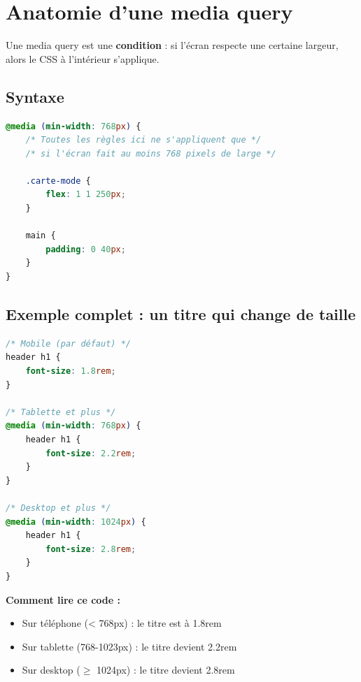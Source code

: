 \documentclass[11pt,a4paper]{article}
\begin{document}
\newpage

\section{Anatomie d'une media query}

Une media query est une \textbf{condition} : si l'écran respecte une
certaine largeur, alors le CSS à l'intérieur s'applique.

\subsection{Syntaxe}

\begin{lstlisting}[language=CSS]
@media (min-width: 768px) {
    /* Toutes les règles ici ne s'appliquent que */
    /* si l'écran fait au moins 768 pixels de large */

    .carte-mode {
        flex: 1 1 250px;
    }

    main {
        padding: 0 40px;
    }
}
\end{lstlisting}

\subsection{Exemple complet : un titre qui change de taille}

\begin{lstlisting}[language=CSS]
/* Mobile (par défaut) */
header h1 {
    font-size: 1.8rem;
}

/* Tablette et plus */
@media (min-width: 768px) {
    header h1 {
        font-size: 2.2rem;
    }
}

/* Desktop et plus */
@media (min-width: 1024px) {
    header h1 {
        font-size: 2.8rem;
    }
}
\end{lstlisting}

\textbf{Comment lire ce code :}
\begin{itemize}[leftmargin=*,nosep]
    \item Sur téléphone (< 768px) : le titre est à 1.8rem
    \item Sur tablette (768-1023px) : le titre devient 2.2rem
    \item Sur desktop ($\geq$ 1024px) : le titre devient 2.8rem
\end{itemize}
\end{document}
